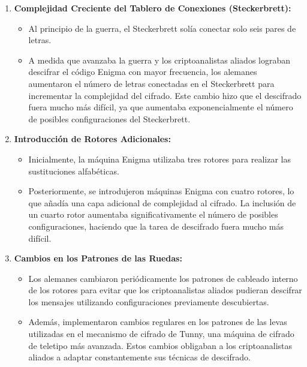 \documentclass{article}
\begin{document}
\begin{enumerate}
    \item \textbf{Complejidad Creciente del Tablero de Conexiones (Steckerbrett):}
    \begin{itemize}
        \item Al principio de la guerra, el Steckerbrett solía conectar solo seis pares de letras.\cite{ColossusO}
        \item A medida que avanzaba la guerra y los criptoanalistas aliados lograban descifrar 
        el código Enigma con mayor frecuencia, los alemanes aumentaron el número de letras conectadas 
        en el Steckerbrett para incrementar la complejidad del cifrado. Este cambio hizo que el descifrado 
        fuera mucho más difícil, ya que aumentaba exponencialmente el número de posibles configuraciones del 
        Steckerbrett.\cite{AlanTuringEnigmaO}
    \end{itemize}

    \item \textbf{Introducción de Rotores Adicionales:}
    \begin{itemize}
        \item Inicialmente, la máquina Enigma utilizaba tres rotores para realizar las sustituciones 
        alfabéticas.\cite{AlanTuringEnigmaO}
        \item Posteriormente, se introdujeron máquinas Enigma con cuatro rotores, lo que añadía una capa 
        adicional de complejidad al cifrado. La inclusión de un cuarto rotor aumentaba significativamente 
        el número de posibles configuraciones, haciendo que la tarea de descifrado fuera mucho más difícil.\cite{AlanTuringEnigmaO}
    \end{itemize}

    \item \textbf{Cambios en los Patrones de las Ruedas:}
    \begin{itemize}
        \item Los alemanes cambiaron periódicamente los patrones de cableado interno de los rotores para 
        evitar que los criptoanalistas aliados pudieran descifrar los mensajes utilizando configuraciones 
        previamente descubiertas.\cite{AlanTuringEnigmaO}\cite{NatGeo}
        \item Además, implementaron cambios regulares en los patrones de las levas utilizadas en el mecanismo 
        de cifrado de Tunny, una máquina de cifrado de teletipo más avanzada. Estos cambios obligaban a 
        los criptoanalistas aliados a adaptar constantemente sus técnicas de descifrado.\cite{ColossusO}
    \end{itemize}


\end{enumerate}
\end{document}
